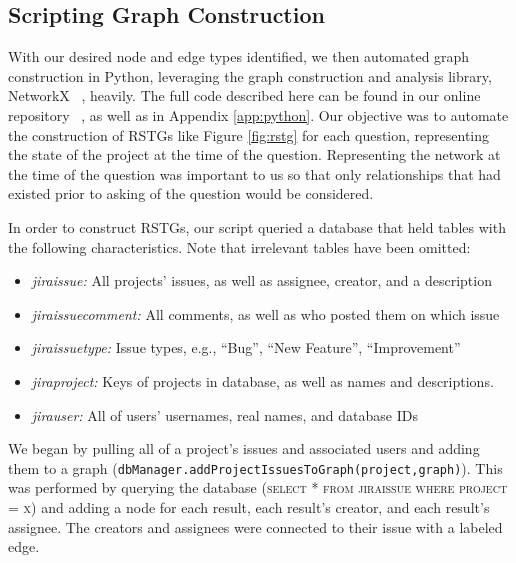 \subsection{Scripting Graph Construction}
With our desired node and edge types identified, we then automated graph construction in Python, leveraging the graph construction and analysis library, NetworkX ~\cite{networkx}, heavily. The full code described here can be found in our online repository ~\cite{repo}, as well as in Appendix \ref{app:python}. Our objective was to automate the construction of RSTGs like Figure \ref{fig:rstg} for each question, representing the state of the project at the time of the question. Representing the network at the time of the question was important to us so that only relationships that had existed prior to asking of the question would be considered.

In order to construct RSTGs, our script queried a database that held tables with the following characteristics. Note that irrelevant tables have been omitted:
\begin{itemize}
  \item \textit{jira\textunderscore issue:} All projects' issues, as well as assignee, creator, and a description
  \item \textit{jira\textunderscore issue\textunderscore comment:} All comments, as well as who posted them on which issue
  \item \textit{jira\textunderscore issue\textunderscore type:} Issue types, e.g., ``Bug'', ``New Feature'', ``Improvement''
  \item \textit{jira\textunderscore project:} Keys of projects in database, as well as names and descriptions. 
  \item \textit{jira\textunderscore user:} All of users' usernames, real names, and database IDs
\end{itemize}

We began by pulling all of a project's issues and associated users and adding them to a graph (\texttt{dbManager.addProjectIssuesToGraph(project,graph)}). This was performed by querying the database (\textsc{select * from jira\textunderscore issue where project = x}) and adding a node for each result, each result's creator, and each result's assignee. The creators and assignees were connected to their issue with a labeled edge.


